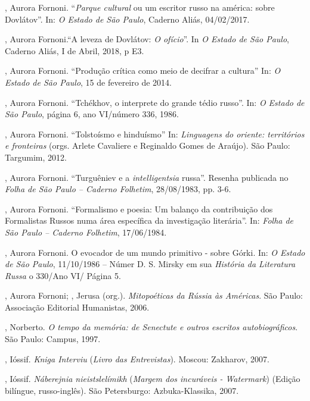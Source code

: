 \begin{Parskip}
, Aurora Fornoni. ``\emph{Parque cultural} ou um escritor
russo na américa: sobre Dovlátov''. In: \emph{O Estado de São Paulo},
Caderno Aliás, 04/02/2017.

, Aurora Fornoni.``A leveza de Dovlátov: \emph{O ofício}''. In
\emph{O Estado de São Paulo}, Caderno Aliás, I de Abril, 2018, p E3.

, Aurora Fornoni. ``Produção crítica como meio de decifrar a
cultura'' In: \emph{O Estado de São Paulo}, 15 de fevereiro de 2014.

, Aurora Fornoni. ``Tchékhov, o interprete do grande tédio
russo''. In: \emph{O Estado de São Paulo}, página 6, ano VI/número 336,
1986.

, Aurora Fornoni. ``Tolstoísmo e hinduísmo'' In:
\emph{Linguagens do oriente: territórios e fronteiras} (orgs. Arlete
Cavaliere e Reginaldo Gomes de Araújo). São Paulo: Targumim, 2012.

, Aurora Fornoni. ``Turguêniev e a \emph{intelligentsia}
russa''. Resenha publicada no \emph{Folha de São Paulo -- Caderno
Folhetim}, 28/08/1983, pp. 3-6.

, Aurora Fornoni. ``Formalismo e poesia: Um balanço da
contribuição dos Formalistas Russos numa área específica da investigação
literária''. In: \emph{Folha de São Paulo -- Caderno Folhetim},
17/06/1984.

, Aurora Fornoni. O evocador de um mundo primitivo - sobre
Górki. In: \emph{O Estado de São Paulo}, 11/10/1986 -- Númer D. S. Mirsky
em sua \emph{História da Literatura Russa} o 330/Ano VI/ Página 5.

, Aurora Fornoni; , Jerusa (org.). \emph{Mitopoéticas da Rússia às
Américas}. São Paulo: Associação Editorial Humanistas, 2006.

, Norberto. \emph{O tempo da memória: de Senectute e outros escritos
autobiográficos}. São Paulo: Campus, 1997.

, Ióssif. \emph{Kniga Interviu} (\emph{Livro das Entrevistas}).
Moscou: Zakharov, 2007.

, Ióssif. \emph{Náberejnia nieistslelímikh} (\emph{Margem dos
incuráveis - Watermark}) (Edição bilíngue, russo-inglês). São
Petersburgo: Azbuka-Klassika, 2007.


\end{Parskip}
